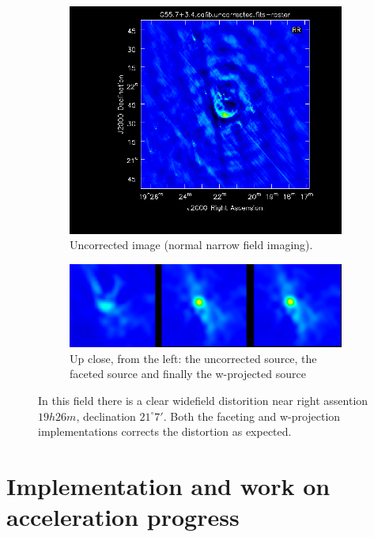 \documentclass[a4paper,10pt]{article}
\begin{document}
\begin{figure}[h!]
\begin{subfigure}[b]{0.49\textwidth}
 \end{subfigure}
 \begin{subfigure}[b]{0.49\textwidth}
    \centering
    \includegraphics[width=\textwidth]{images/uncorrected.png}
    \caption{Uncorrected image (normal narrow field imaging).}
 \end{subfigure}
 \begin{subfigure}[b]{0.49\textwidth}
    \centering
    \includegraphics[width=\textwidth]{images/corrections.png}
    \caption{Up close, from the left: the uncorrected source, the faceted source and 
    finally the w-projected source}
 \end{subfigure}
 \caption[Supernova reminant G55.7+3.4]{In this field there is a clear widefield distorition near
 right assention $19h26m$, declination $21^\circ7'$. Both the faceting and w-projection
 implementations corrects the distortion as expected.}
 \label{FIG_SUPERNOVA}
\end{figure}
\section{Implementation and work on acceleration progress}
\end{document}
